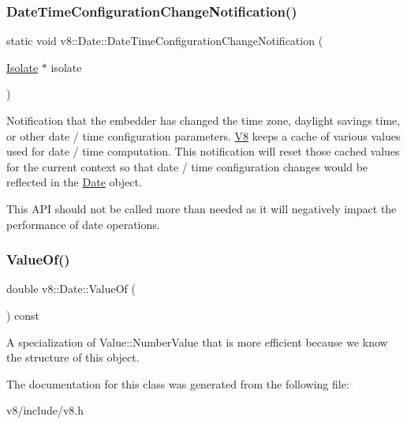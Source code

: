 \subsubsection{\texorpdfstring{Date\+Time\+Configuration\+Change\+Notification()}{DateTimeConfigurationChangeNotification()}}
{\footnotesize\ttfamily static void v8\+::\+Date\+::\+Date\+Time\+Configuration\+Change\+Notification (\begin{DoxyParamCaption}\item[{\mbox{\hyperlink{classv8_1_1Isolate}{Isolate}} $\ast$}]{isolate }\end{DoxyParamCaption})\hspace{0.3cm}{\ttfamily [static]}}

Notification that the embedder has changed the time zone, daylight savings time, or other date / time configuration parameters. \mbox{\hyperlink{classv8_1_1V8}{V8}} keeps a cache of various values used for date / time computation. This notification will reset those cached values for the current context so that date / time configuration changes would be reflected in the \mbox{\hyperlink{classv8_1_1Date}{Date}} object.

This A\+PI should not be called more than needed as it will negatively impact the performance of date operations. \mbox{\label{classv8_1_1Date_adb9d292549a173e045ee177051dbde19}} 
\subsubsection{\texorpdfstring{Value\+Of()}{ValueOf()}}
{\footnotesize\ttfamily double v8\+::\+Date\+::\+Value\+Of (\begin{DoxyParamCaption}{ }\end{DoxyParamCaption}) const}

A specialization of Value\+::\+Number\+Value that is more efficient because we know the structure of this object. 

The documentation for this class was generated from the following file\+:\begin{DoxyCompactItemize}
\item 
v8/include/v8.\+h\end{DoxyCompactItemize}
